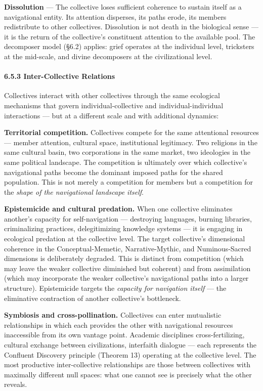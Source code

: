 \textbf{Dissolution} — The collective loses sufficient coherence to sustain itself as a navigational entity. Its attention disperses, its paths erode, its members redistribute to other collectives. Dissolution is not death in the biological sense — it is the return of the collective's constituent attention to the available pool. The decomposer model (§6.2) applies: grief operates at the individual level, tricksters at the mid-scale, and divine decomposers at the civilizational level.


\paragraph*{6.5.3 Inter-Collective Relations}


Collectives interact with other collectives through the same ecological mechanisms that govern individual-collective and individual-individual interactions — but at a different scale and with additional dynamics:


\textbf{Territorial competition.} Collectives compete for the same attentional resources — member attention, cultural space, institutional legitimacy. Two religions in the same cultural basin, two corporations in the same market, two ideologies in the same political landscape. The competition is ultimately over which collective's navigational paths become the dominant imposed paths for the shared population. This is not merely a competition for members but a competition for the \textit{shape of the navigational landscape itself}.


\textbf{Epistemicide and cultural predation.} When one collective eliminates another's capacity for self-navigation — destroying languages, burning libraries, criminalizing practices, delegitimizing knowledge systems — it is engaging in ecological predation at the collective level. The target collective's dimensional coherence in the Conceptual-Memetic, Narrative-Mythic, and Numinous-Sacred dimensions is deliberately degraded. This is distinct from competition (which may leave the weaker collective diminished but coherent) and from assimilation (which may incorporate the weaker collective's navigational paths into a larger structure). Epistemicide targets the \textit{capacity for navigation itself} — the eliminative contraction of another collective's bottleneck.


\textbf{Symbiosis and cross-pollination.} Collectives can enter mutualistic relationships in which each provides the other with navigational resources inaccessible from its own vantage point. Academic disciplines cross-fertilizing, cultural exchange between civilizations, interfaith dialogue — each represents the Confluent Discovery principle (Theorem 13) operating at the collective level. The most productive inter-collective relationships are those between collectives with maximally different null spaces: what one cannot see is precisely what the other reveals.


